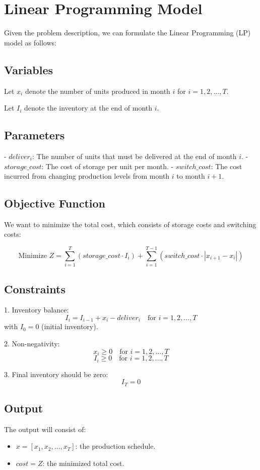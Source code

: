 \documentclass{article}
\begin{document}
\section*{Linear Programming Model}

Given the problem description, we can formulate the Linear Programming (LP) model as follows:

\subsection*{Variables}
Let \( x_i \) denote the number of units produced in month \( i \) for \( i = 1, 2, \ldots, T \).

Let \( I_i \) denote the inventory at the end of month \( i \).

\subsection*{Parameters}
- \( deliver_i \): The number of units that must be delivered at the end of month \( i \).
- \( storage\_cost \): The cost of storage per unit per month.
- \( switch\_cost \): The cost incurred from changing production levels from month \( i \) to month \( i+1 \).

\subsection*{Objective Function}
We want to minimize the total cost, which consists of storage costs and switching costs:

\[
\text{Minimize } Z = \sum_{i=1}^{T} (storage\_cost \cdot I_i) + \sum_{i=1}^{T-1} (switch\_cost \cdot |x_{i+1} - x_i|)
\]

\subsection*{Constraints}
1. Inventory balance:
\[
I_i = I_{i-1} + x_i - deliver_i \quad \text{for } i = 1, 2, \ldots, T
\]
with \( I_0 = 0 \) (initial inventory).

2. Non-negativity:
\[
x_i \geq 0 \quad \text{for } i = 1, 2, \ldots, T
\]
\[
I_i \geq 0 \quad \text{for } i = 1, 2, \ldots, T
\]

3. Final inventory should be zero:
\[
I_T = 0
\]

\subsection*{Output}
The output will consist of:
\begin{itemize}
    \item \( x = [x_1, x_2, \ldots, x_T] \): the production schedule.
    \item \( cost = Z \): the minimized total cost.
\end{itemize}
\end{document}
